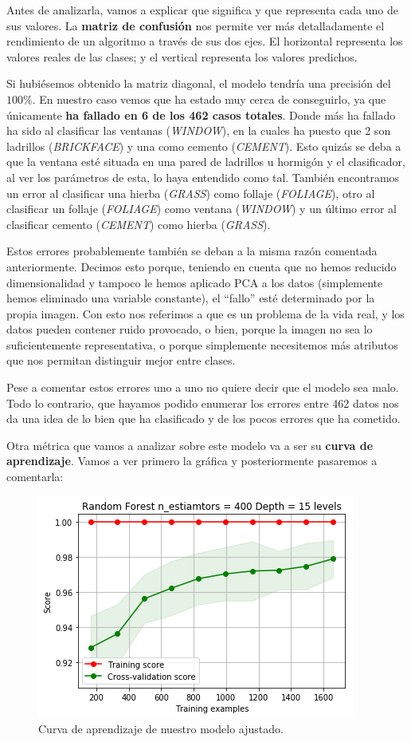 \documentclass[11pt,a4paper]{article}
\begin{document}
Antes de analizarla, vamos a explicar que significa y que representa cada uno de sus valores. La \textbf{matriz de confusión} nos permite ver más
detalladamente el rendimiento de un algoritmo a través de sus dos ejes. El horizontal representa los valores reales de las clases;
y el vertical representa los valores predichos.

Si hubiésemos obtenido la matriz diagonal, el modelo tendría una precisión del $100\%$. En nuestro caso vemos que ha estado muy cerca de
conseguirlo, ya que únicamente \textbf{ha fallado en 6 de los 462 casos totales}. Donde más ha fallado ha sido al clasificar las ventanas
(\textit{WINDOW}), en la cuales ha puesto que 2 son ladrillos (\textit{BRICKFACE}) y una como cemento (\textit{CEMENT}). Esto quizás se
deba a que la ventana esté situada en una pared de ladrillos u hormigón y el clasificador, al ver los parámetros de esta, lo haya
entendido como tal. También encontramos un error al clasificar una hierba (\textit{GRASS}) como follaje (\textit{FOLIAGE}), otro al
clasificar un follaje (\textit{FOLIAGE}) como ventana (\textit{WINDOW}) y un último error al clasificar cemento (\textit{CEMENT}) como
hierba (\textit{GRASS}).

Estos errores probablemente también se deban a la misma razón comentada anteriormente. Decimos esto porque, teniendo en cuenta que no
hemos reducido dimensionalidad y tampoco le hemos aplicado PCA a los datos (simplemente hemos eliminado una variable constante), el ``fallo'' 
esté determinado por la propia imagen. Con esto nos referimos a que es un problema de la vida real, y los datos pueden contener ruido
provocado, o bien, porque la imagen no sea lo suficientemente representativa, o porque simplemente necesitemos más atributos que nos
permitan distinguir mejor entre clases.

Pese a comentar estos errores uno a uno no quiere decir que el modelo sea malo. Todo lo contrario, que hayamos podido enumerar los errores
entre 462 datos nos da una idea de lo bien que ha clasificado y de los pocos errores que ha cometido.

Otra métrica que vamos a analizar sobre este modelo va a ser su \textbf{curva de aprendizaje}. Vamos a ver primero la gráfica y
posteriormente pasaremos a comentarla:

\begin{figure}[H]
    \centering
    \includegraphics[scale=0.75]{img/lc-rf.png}
    \caption{Curva de aprendizaje de nuestro modelo ajustado.}
    \label{fig:lc-rf}
\end{figure}
\end{document}

